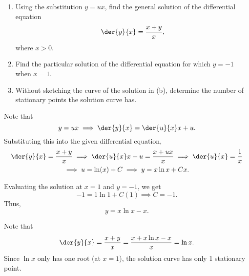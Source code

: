 \begin{problem}
    \begin{enumerate}
        \item Using the substitution $y = ux$, find the general solution of the differential equation \[\der{y}{x} = \frac{x+y}{x},\] where $x > 0$.
        \item Find the particular solution of the differential equation for which $y = -1$ when $x = 1$.
        \item Without sketching the curve of the solution in (b), determine the number of stationary points the solution curve has.
    \end{enumerate}
\end{problem}
\begin{solution}
    \begin{ppart}
        Note that \[y = ux \implies \der{y}{x} = \der{u}{x} x + u.\] Substituting this into the given differential equation, 
        \begin{gather*}
            \der{y}{x} = \frac{x+y}{x} \implies\der{u}{x} x + u = \frac{x + ux}{x} \implies \der{u}{x} = \frac1x \\
            \implies u = \ln (x) + C \implies y = x\ln x + Cx.
        \end{gather*}
    \end{ppart}
    \begin{ppart}
        Evaluating the solution at $x = 1$ and $y = -1$, we get \[-1 = 1 \ln 1 + C (1) \implies C = -1.\] Thus, \[y = x \ln x - x.\]
    \end{ppart}
    \begin{ppart}
        Note that \[\der{y}{x} = \frac{x+y}{x} = \frac{x + x\ln x - x}{x} = \ln x.\] Since $\ln x$ only has one root (at $x = 1$), the solution curve has only 1 stationary point.
    \end{ppart}
\end{solution}

